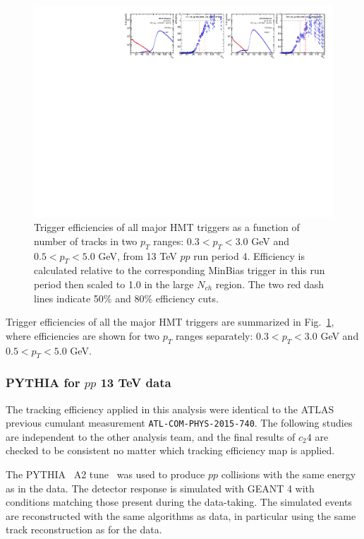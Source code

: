\begin{figure}[H]
\centering
\includegraphics[width=1.\linewidth]{figs/sec_evtSlc/trigEff_pp13_run4/trigEff_Trig30.pdf}
\caption{Trigger efficiencies of all major HMT triggers as a function of number of tracks in two $p_{T}$ ranges: $0.3<p_{T}<3.0$ GeV and $0.5<p_{T}<5.0$ GeV, from 13 TeV $pp$ run period 4. Efficiency is calculated relative to the corresponding MinBias trigger in this run period then scaled to 1.0 in the large $N_{ch}$ region. The two red dash lines indicate 50$\%$ and 80$\%$ efficiency cuts.}
\label{fig:trigEff_pp13_run4}
\end{figure}
Trigger efficiencies of all the major HMT triggers are summarized in Fig.~\ref{fig:trigEff_pp13_run4}, where efficiencies are shown for two $p_{T}$ ranges separately: $0.3<p_{T}<3.0$ GeV and $0.5<p_{T}<5.0$ GeV.



\subsubsection{PYTHIA for $pp$ 13 TeV data}

The tracking efficiency applied in this analysis were identical to the ATLAS previous cumulant measurement \verb|ATL-COM-PHYS-2015-740|. The following studies are independent to the other analysis team, and the final results of $c_{2}{4}$ are checked to be consistent no matter which tracking efficiency map is applied.

The PYTHIA~\cite{Sjostrand:2007gs} A2 tune~\cite{atlas:6} was used to produce $pp$ collisions with the same energy as in the data. The detector response is simulated with GEANT 4 with conditions matching those present during the data-taking. The simulated events are reconstructed with the same algorithms as data, in particular using the same track reconstruction as for the data.

